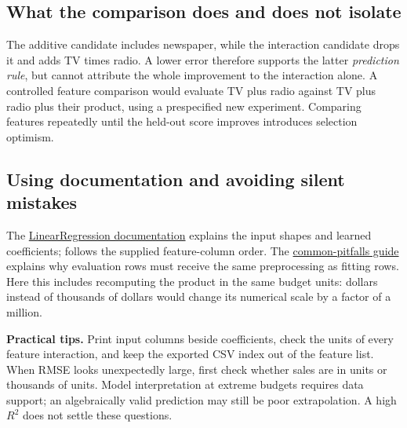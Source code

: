 \subsection*{What the comparison does and does not isolate}
The additive candidate includes newspaper, while the interaction candidate drops it and adds TV times radio.
A lower error therefore supports the latter \emph{prediction rule}, but cannot attribute the whole improvement
to the interaction alone. A controlled feature comparison would evaluate TV plus radio against TV plus radio plus their product,
using a prespecified new experiment. Comparing features repeatedly until the held-out score improves introduces selection optimism.

\subsection*{Using documentation and avoiding silent mistakes}
The \href{https://scikit-learn.org/1.8/modules/generated/sklearn.linear_model.LinearRegression.html}{LinearRegression documentation}
explains the input shapes and learned coefficients;  follows the supplied feature-column order.
The \href{https://scikit-learn.org/1.8/common_pitfalls.html}{common-pitfalls guide}
explains why evaluation rows must receive the same preprocessing as fitting rows.
Here this includes recomputing the product in the same budget units: dollars instead of thousands of dollars
would change its numerical scale by a factor of a million.

\textbf{Practical tips.} Print input columns beside coefficients, check the units of every feature interaction,
and keep the exported CSV index out of the feature list. When RMSE looks unexpectedly large, first check whether
sales are in units or thousands of units. Model interpretation at extreme budgets requires data support;
an algebraically valid prediction may still be poor extrapolation. A high $R^2$ does not settle these questions.


